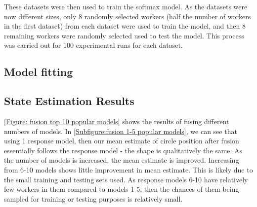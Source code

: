 These datasets were then used to train the softmax model. 
As the datasets were now different sizes, only 8 randomly selected workers (half the number of workers in the first dataset) from each dataset were used to train the model, and then 8 remaining workers were randomly selected used to test the model. This process was carried out for 100 experimental runs for each dataset. 

\subsection{Model fitting}










\subsection{State Estimation Results}

\ref{Figure: fusion top 10 popular models} shows the results of fusing different numbers of models. 
In \ref{Subfigure:fusion 1-5 popular models}, we can see that using 1 response model, then our mean estimate of circle position after fusion essentially follows the response model - the shape is qualitatively the same.  
As the number of models is increased, the mean estimate is improved. Increasing from 6-10 models shows little improvement in mean estimate. This is likely due to the small training and testing sets used.
 As response models 6-10 have relatively few workers in them compared to models 1-5, then the chances of them being sampled for training or testing purposes is relatively small.


